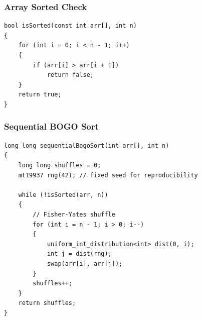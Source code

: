 \documentclass[11pt]{article}
\begin{document}
\subsubsection{Array Sorted Check}
\begin{codebox}
\begin{lstlisting}
bool isSorted(const int arr[], int n)
{
    for (int i = 0; i < n - 1; i++)
    {
        if (arr[i] > arr[i + 1])
            return false;
    }
    return true;
}
\end{lstlisting}
\end{codebox}

\subsubsection{Sequential BOGO Sort}
\begin{codebox}
\begin{lstlisting}
long long sequentialBogoSort(int arr[], int n)
{
    long long shuffles = 0;
    mt19937 rng(42); // fixed seed for reproducibility

    while (!isSorted(arr, n))
    {
        // Fisher-Yates shuffle
        for (int i = n - 1; i > 0; i--)
        {
            uniform_int_distribution<int> dist(0, i);
            int j = dist(rng);
            swap(arr[i], arr[j]);
        }
        shuffles++;
    }
    return shuffles;
}
\end{lstlisting}
\end{codebox}

\newpage
\end{document}
